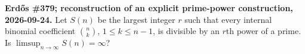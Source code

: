 \textbf{Erd\H{o}s \#379; reconstruction of an explicit prime-power construction, 2026-09-24.}
Let $S(n)$ be the largest integer $r$ such that every internal binomial coefficient $\binom nk$, $1\leq k\leq n-1$, is divisible by an $r$th power of a prime. Is $\limsup_{n\to\infty}S(n)=\infty$?
